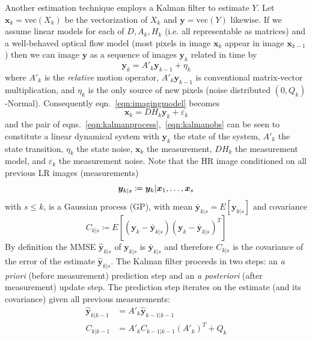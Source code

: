 Another estimation technique employs a Kalman filter\cite{elad1999} to estimate $Y$.
%
Let $\bm{x}_k = \text{vec}(X_k)$ be the vectorization of $X_k$ and $\bm{y} = \text{vec}(Y)$ likewise.
%
If we assume linear models for each of $D, A_k, H_k$ (i.e. all representable as matrices) and a well-behaved optical flow model (most pixels in image $\bm{x}_k$ appear in image $\bm{x}_{k-1}$) then we can image $\bm{y}$ as a sequence of images $\bm{y}_k$ related in time by
\begin{equation}
    \bm{y}_k = A'_k \bm{y}_{k-1} + \eta_k
    \label{eqn:kalmanprocess}
\end{equation}
%
where $A'_k$ is the \textit{relative} motion operator, $A'_k\bm{y}_{k-1}$ is conventional matrix-vector multiplication, and $\eta_k$ is the only source of new pixels (noise distributed $(0, Q_k)$-Normal).
%
Consequently eqn.~\ref{eqn:imagingmodel} becomes
\begin{equation}
    \bm{x}_k = DH_k\bm{y}_k + \varepsilon_k
    \label{eqn:kalmanobs}
\end{equation}
and the pair of eqns.~\ref{eqn:kalmanprocess},~\ref{eqn:kalmanobs} can be seen to constitute a linear dynamical system with $\bm{y}_k$ the state of the system, $A'_k$ the state transition, $\eta_k$ the state noise, $\bm{x}_k$ the measurement, $DH_k$ the measurement model, and $\varepsilon_k$ the measurement noise.
%
Note that the HR image conditioned on all previous LR images (measurements)
\begin{equation}
    \bm{y}_{k|s} \coloneqq \bm{y}_k|\bm{x}_1, \mathellipsis, \bm{x}_s
\end{equation}
with $s \leq k$, is a Gaussian process (GP), with mean $\bar{\bm{y}}_{k|s} = E\left[\bm{y}_{k|s}\right]$
and covariance
\begin{equation}
    C_{k|s} \coloneqq E\left[ (\bm{y}_k - \bar{\bm{y}}_{k|s})(\bm{y}_k - \bar{\bm{y}}_{k|s})^T  \right]
\end{equation}
%
By definition the MMSE $\hat{\bm{y}}_{k|s}$ of $\bm{y}_{k|s}$ is $\bar{\bm{y}}_{k|s}$ and therefore $C_{k|s}$ is the covariance of the error of the estimate $\hat{\bm{y}}_{k|s}$.
%
The Kalman filter proceeds in two steps: an \textit{a priori} (before measurement) prediction step and an \textit{a posteriori} (after measurement) update step.
%
The prediction step iterates on the estimate (and its covariance) given all previous measurements:
\begin{align}
    \hat{\bm{y}}_{k|k-1} &= A'_k \hat{\bm{y}}_{k-1|k-1} \\
    C_{k|k-1} &= A'_k C_{k-1|k-1} (A'_k)^T + Q_k
\end{align}
